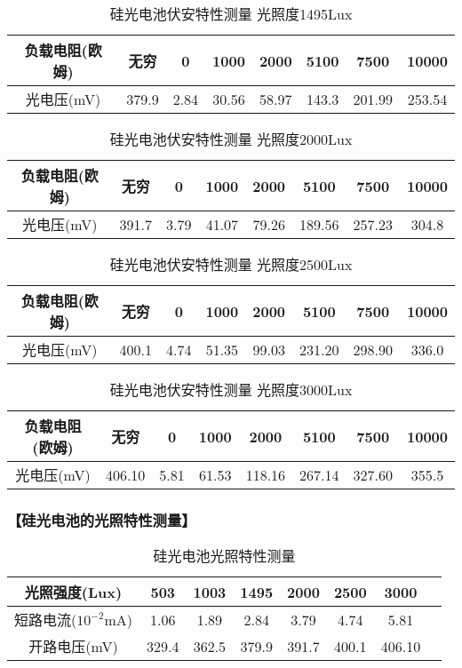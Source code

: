 \documentclass{ctexart}
\let\oldsubsubsection\subsubsection
\renewcommand{\subsubsection}[1]{\oldsubsubsection{\!\!\!\!\!\!【#1】}}
\begin{document}
\begin{table}[H]
  \centering
  \begin{tabular}{|c|c|c|c|c|c|c|c|}
    \hline
    负载电阻(欧姆) &无穷&0&1000&2000&5100&7500&10000\\\hline
    光电压(mV) &379.9&2.84&30.56&58.97&143.3&201.99&253.54\\\hline
  \end{tabular}
  \caption{硅光电池伏安特性测量 光照度1495Lux}
\end{table}

\begin{table}[H]
  \centering
  \begin{tabular}{|c|c|c|c|c|c|c|c|}
    \hline
    负载电阻(欧姆) &无穷&0&1000&2000&5100&7500&10000\\\hline
    光电压(mV) &391.7&3.79&41.07&79.26&189.56&257.23&304.8\\\hline
  \end{tabular}
  \caption{硅光电池伏安特性测量 光照度2000Lux}
\end{table}

\begin{table}[H]
  \centering
  \begin{tabular}{|c|c|c|c|c|c|c|c|}
    \hline
    负载电阻(欧姆) &无穷&0&1000&2000&5100&7500&10000\\\hline
    光电压(mV) &400.1&4.74&51.35&99.03&231.20&298.90&336.0\\\hline
  \end{tabular}
  \caption{硅光电池伏安特性测量 光照度2500Lux}
\end{table}

\begin{table}[H]
  \centering
  \begin{tabular}{|c|c|c|c|c|c|c|c|}
    \hline
    负载电阻(欧姆) &无穷&0&1000&2000&5100&7500&10000\\\hline
    光电压(mV) &406.10&5.81&61.53&118.16&267.14&327.60&355.5\\\hline
  \end{tabular}
  \caption{硅光电池伏安特性测量 光照度3000Lux}
\end{table}

\subsubsection{硅光电池的光照特性测量}

\begin{table}[H]
  \centering
  \begin{tabular}{|c|c|c|c|c|c|c|c|}
    \hline
    光照强度(Lux) &503&1003&1495&2000&2500&3000\\\hline
    短路电流($10^{-2}$mA) &1.06&1.89&2.84&3.79&4.74&5.81\\\hline
    开路电压(mV) &329.4&362.5&379.9&391.7&400.1&406.10\\\hline
  \end{tabular}
  \caption{硅光电池光照特性测量}
\end{table}
\end{document}
